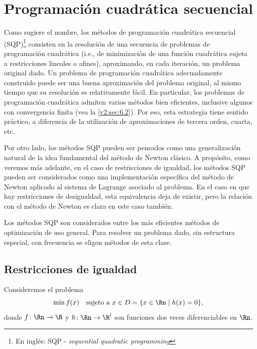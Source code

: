 
\section{Programación cuadrática secuencial}
\label{v2:sec:4.6}

Como sugiere el nombre, los métodos de programación cuadrática secuencial (SQP)\footnote{En inglés: SQP - \textit{sequential quadratic programming}} consisten en la resolución de una secuencia de problemas de programación cuadrática (i.e., de minimización de una función cuadrática sujeta a restricciones lineales o afines), aproximando, en cada iteración, un problema original dado. Un problema de programación cuadrática adecuadamente construido puede ser una buena aproximación del problema original, al mismo tiempo que su resolución es relativamente fácil. En particular, los problemas de programación cuadrática admiten varios métodos bien eficientes, inclusive algunos con convergencia finita (vea la \cref{v2:sec:6.2}). Por eso, esta estrategia tiene sentido práctico, a diferencia de la utilización de aproximaciones de tercera orden, cuarta, etc.

Por otro lado, los métodos SQP pueden ser pensados como una generalización natural de la idea fundamental del método de Newton clásico. A propósito, como veremos más adelante, en el caso de restricciones de igualdad, los métodos SQP pueden ser considerados como una implementación específica del método de Newton aplicado al sistema de Lagrange asociado al problema. En el caso en que hay restricciones de desigualdad, esta equivalencia deja de existir, pero la relación con el método de Newton es clara en este caso también.

Los métodos SQP son considerados entre los más eficientes métodos de optimización de uso general. Para resolver un problema dado, sin estructura especial, con frecuencia se eligen métodos de esta clase.

\subsection{Restricciones de igualdad}
\label{v2:sec:4.6.1}

Consideremos el problema
\begin{equation}
\min f(x) \quad \text{sujeto a } x \in D = \{ x \in \Rn \mid h(x) = 0 \},
\label{v2:eq:4.221}
\end{equation}
donde $f \colon \Rn \to \R$ y $h \colon \Rn \to \R^l$ son funciones dos veces diferenciables en $\Rn$.

